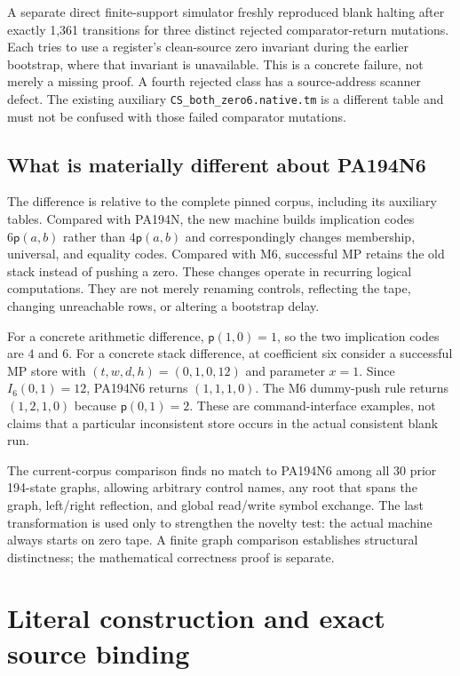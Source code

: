 \documentclass[10pt,letterpaper]{article}
\newcommand{\pair}{\mathsf p}
\newcommand{\file}[1]{\nolinkurl{#1}}
\begin{document}
A separate direct finite-support simulator freshly reproduced blank halting
after exactly 1,361 transitions for three distinct rejected comparator-return
mutations. Each tries to use a register's clean-source zero invariant during
the earlier bootstrap, where that invariant is unavailable. This is a
concrete failure, not merely a missing proof. A fourth rejected class has a
source-address scanner defect. The existing auxiliary
\file{CS_both_zero6.native.tm} is a different table and must not be confused
with those failed comparator mutations.

\subsection{What is materially different about PA194N6}

The difference is relative to the complete pinned corpus, including its
auxiliary tables. Compared with PA194N, the new machine builds implication
codes $6\pair(a,b)$ rather than $4\pair(a,b)$ and correspondingly changes
membership, universal, and equality codes. Compared with M6, successful MP
retains the old stack instead of pushing a zero. These changes operate in
recurring logical computations. They are not merely renaming controls,
reflecting the tape, changing unreachable rows, or altering a bootstrap delay.

For a concrete arithmetic difference, $\pair(1,0)=1$, so the two implication
codes are $4$ and $6$. For a concrete stack difference, at coefficient six
consider a successful MP store with $(t,w,d,h)=(0,1,0,12)$ and parameter
$x=1$. Since $I_6(0,1)=12$, PA194N6 returns
$(1,1,1,0)$. The M6 dummy-push rule returns $(1,2,1,0)$ because
$\pair(0,1)=2$. These are command-interface examples, not claims that a
particular inconsistent store occurs in the actual consistent blank run.

The current-corpus comparison finds no match to PA194N6 among all 30 prior
194-state graphs, allowing arbitrary control names, any root that spans the
graph, left/right reflection, and global read/write symbol exchange. The
last transformation is used only to strengthen the novelty test: the actual
machine always starts on zero tape. A finite graph comparison establishes
structural distinctness; the mathematical correctness proof is separate.

\section{Literal construction and exact source binding}
\label{sec:construction}
\end{document}
